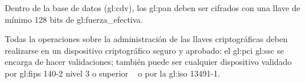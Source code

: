 {
  Dentro de la base de datos (\gls{gl:cdv}), los \gls{gl:pan} deben ser
  cifrados con una llave de mínimo 128 bits de \gls{gl:fuerza_efectiva}.
}

{
  Todas la operaciones sobre la administración de las llaves criptográficas
  deben realizarse en un dispositivo criptográfico seguro y aprobado: el
  \gls{gl:pci} \gls{gl:ssc} se encarga de hacer validaciones; también puede ser
  cualquier dispositivo validado por \gls{gl:fips} 140-2 nivel 3 o superior
 ~\cite{nist_modulos_criptograficos} o por la \gls{gl:iso} 13491-1.
}
